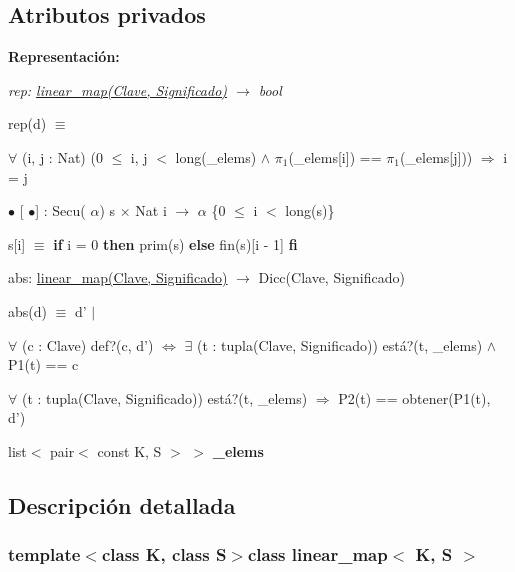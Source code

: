 \subsection*{Atributos privados}
\begin{Indent}{\bf Representación\-:}\par
{\em rep\-: \hyperlink{classlinear__map}{linear\-\_\-map(\-Clave, Significado)} $\to$ bool\par
rep(d) $\equiv$
\begin{DoxyItemize}
\item $\forall$ (i, j \-: Nat) (0 $\leq$ i, j $<$ long(\-\_\-elems) $\land$ $\pi_1$(\-\_\-elems\mbox{[}i\mbox{]}) == $\pi_1$(\-\_\-elems\mbox{[}j\mbox{]})) $\Rightarrow$ i = j
\end{DoxyItemize}

$\bullet$ \mbox{[} $\bullet$\mbox{]} \-: Secu( $\alpha$) s $\times$ Nat i $\rightarrow$ $\alpha$ \{0 $\leq$ i $<$ long(s)\} \par
s\mbox{[}i\mbox{]} $\equiv$ {\bfseries if} i = 0 {\bfseries then} prim(s) {\bfseries else} fin(s)\mbox{[}i -\/ 1\mbox{]} {\bfseries fi} 

abs\-: \hyperlink{classlinear__map}{linear\-\_\-map(\-Clave, Significado)} $\to$ Dicc(\-Clave, Significado)\par
abs(d) $\equiv$ d' $|$
\begin{DoxyItemize}
\item $\forall$ (c \-: Clave) def?(c, d') $\Leftrightarrow$ $\exists$ (t \-: tupla(\-Clave, Significado)) está?(t, \-\_\-elems) $\land$ P1(t) == c
\item $\forall$ (t \-: tupla(\-Clave, Significado)) está?(t, \-\_\-elems) $\Rightarrow$ P2(t) == obtener(P1(t), d') 
\end{DoxyItemize}}\begin{DoxyCompactItemize}
\item 
\hypertarget{classlinear__map_aeb6846d41a9b28c5511b1ece965efe61}{list$<$ pair$<$ const K, S $>$ $>$ {\bfseries \-\_\-elems}}\label{classlinear__map_aeb6846d41a9b28c5511b1ece965efe61}

\end{DoxyCompactItemize}
\end{Indent}


\subsection{Descripción detallada}
\subsubsection*{template$<$class K, class S$>$class linear\-\_\-map$<$ K, S $>$}

